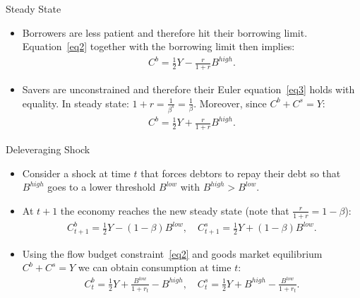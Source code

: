 \documentclass[11pt,aspectratio=169]{beamer}
\newcommand{\highlight}[1]{\textcolor{myblue}{#1}}
\begin{document}
\begin{frame}{Steady State}
\small
    \begin{itemize}
        \item Borrowers are less patient and therefore hit their borrowing limit. Equation~\eqref{eq2} together with the borrowing limit then implies:
        \begin{align*}
            C^b = \frac{1}{2}Y - \frac{r}{1+r}B^{high}.
        \end{align*}
       \vspace{1em} 
       \item Savers are unconstrained and therefore their Euler equation~\eqref{eq3} holds with equality. In steady state: $1 + r = \frac{1}{\beta^s}=\frac{1}{\beta}$. Moreover, since $C^b + C^s = Y$:
        \begin{align*}
            C^b = \frac{1}{2}Y + \frac{r}{1+r}B^{high}.
        \end{align*}
    \end{itemize}
\end{frame}

\begin{frame}{Deleveraging Shock}
\small
    \begin{itemize}
        \item Consider a shock at time $t$ that forces debtors to repay their debt so that $B^{high}$ goes to a lower threshold $B^{low}$ with $B^{high} > B^{low}$.
    \vspace{0.3em}
    \item At $t+1$ the economy reaches the new steady state (note that $\frac{r}{1+r} = 1-\beta$): 
        \begin{align*}
            C_{t+1}^b=\frac{1}{2}Y-(1-\beta)B^{low}, \quad
C_{t+1}^s=\frac{1}{2}Y+(1-\beta)B^{low}.
        \end{align*}
      \vspace{0.3em}
      \item Using the flow budget constraint~\eqref{eq2} and goods market equilibrium $C^b + C^s = Y$ we can obtain consumption at time $t$:
        \begin{align*}
            C_t^b=\frac{1}{2}Y+\frac{B^{low}}{1+r_t}-B^{high}, \quad
            C_t^s=\frac{1}{2}Y+B^{high}-\frac{B^{low}}{1+r_t}.
        \end{align*}
    \end{itemize}
\end{frame}

\end{document}
